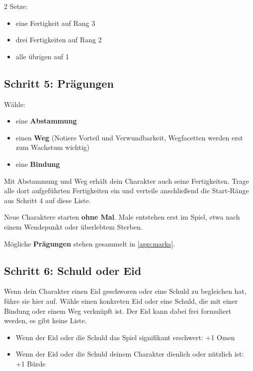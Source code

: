 \begin{multicols*}{2}
Setze:
\begin{itemize}[leftmargin=*]
\item eine Fertigkeit auf Rang 3
\item drei Fertigkeiten auf Rang 2
\item alle übrigen auf 1
\end{itemize}

\subsection{Schritt 5: Prägungen}\label{subsec:schritt-5:-pragungen}

Wähle:
\begin{itemize}[leftmargin=*]
\item eine \textbf{Abstammung}
\item einen \textbf{Weg} (Notiere Vorteil und Verwundbarkeit, Wegfacetten werden erst zum Wachstum wichtig)
\item eine \textbf{Bindung}
\end{itemize}

Mit Abstammung und Weg erhält dein Charakter auch seine Fertigkeiten.
Trage alle dort aufgeführten Fertigkeiten ein und verteile anschließend die Start-Ränge aus Schritt 4 auf diese Liste.

Neue Charaktere starten \textbf{ohne Mal}.
Male entstehen erst im Spiel, etwa nach einem Wendepunkt oder überlebtem Sterben.

Mögliche \textbf{Prägungen} stehen gesammelt in \cref{app:marks}.

\subsection{Schritt 6: Schuld oder Eid}\label{subsec:schritt-6:-schuld-oder-eid}

Wenn dein Charakter einen Eid geschworen oder eine Schuld zu begleichen hat, führe sie hier auf.
Wähle einen konkreten Eid oder eine Schuld, die mit einer Bindung oder einem Weg verknüpft ist.
Der Eid kann dabei frei formuliert werden, es gibt keine Liste.

\begin{itemize}[leftmargin=*]
\item Wenn der Eid oder die Schuld das Spiel signifikant erschwert: +1 Omen
\item Wenn der Eid oder die Schuld deinem Charakter dienlich oder nützlich ist: +1 Bürde
\end{itemize}


\end{multicols*}
